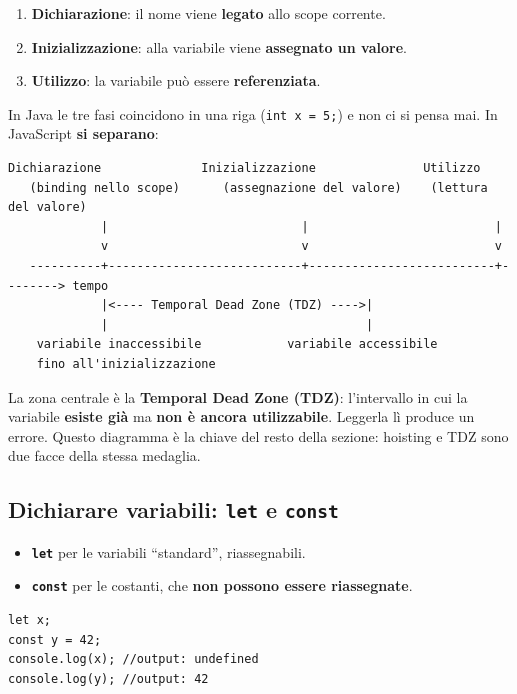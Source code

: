 \documentclass[10pt,a4paper]{article}
\begin{document}
\begin{enumerate}
  \item \textbf{Dichiarazione}: il nome viene \textbf{legato} allo scope corrente.
  \item \textbf{Inizializzazione}: alla variabile viene \textbf{assegnato un valore}.
  \item \textbf{Utilizzo}: la variabile può essere \textbf{referenziata}.
\end{enumerate}

In Java le tre fasi coincidono in una riga (\texttt{int x = 5;}) e non ci si pensa mai. In JavaScript \textbf{si separano}:

\begin{lstlisting}[style=plain]
      Dichiarazione              Inizializzazione               Utilizzo
   (binding nello scope)      (assegnazione del valore)    (lettura del valore)
             |                           |                          |
             v                           v                          v
   ----------+---------------------------+--------------------------+--------> tempo
             |<---- Temporal Dead Zone (TDZ) ---->|
             |                                    |
    variabile inaccessibile            variabile accessibile
    fino all'inizializzazione
\end{lstlisting}

La zona centrale è la \textbf{Temporal Dead Zone (TDZ)}: l'intervallo in cui la variabile \textbf{esiste già} ma \textbf{non è ancora utilizzabile}. Leggerla lì produce un errore. Questo diagramma è la chiave del resto della sezione: hoisting e TDZ sono due facce della stessa medaglia.

\subsection{Dichiarare variabili: \texttt{let} e \texttt{const}}

\begin{itemize}
  \item \textbf{\texttt{let}} per le variabili ``standard'', riassegnabili.
  \item \textbf{\texttt{const}} per le costanti, che \textbf{non possono essere riassegnate}.
\end{itemize}

\begin{lstlisting}[style=js]
let x;
const y = 42;
console.log(x); //output: undefined
console.log(y); //output: 42
\end{lstlisting}
\end{document}
